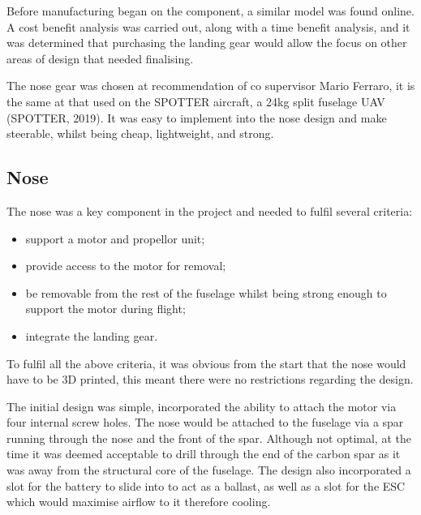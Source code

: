 \documentclass[../../main.tex]{subfiles}
\begin{document}
Before manufacturing began on the component, a similar model was found online. A cost benefit analysis was carried out, along with a time benefit analysis, and it was determined that purchasing the landing gear would allow the focus on other areas of design that needed finalising. 


The nose gear was chosen at recommendation of co supervisor Mario Ferraro, it is the same at that used on the SPOTTER aircraft, a 24kg split fuselage UAV (SPOTTER, 2019). It was easy to implement into the nose design and make steerable, whilst being cheap, lightweight, and strong. 

\subsection{Nose} \label{sec:design-process:final-design-proposal:nose}

The nose was a key component in the project and needed to fulfil several criteria:

\begin{itemize}
    \item support a motor and propellor unit;
    \item provide access to the motor for removal;
    \item be removable from the rest of the fuselage whilst being strong enough to support the motor during flight;
    \item integrate the landing gear.
\end{itemize}

To fulfil all the above criteria, it was obvious from the start that the nose would have to be 3D printed, this meant there were no restrictions regarding the design.  

The initial design was simple, incorporated the ability to attach the motor via four internal screw holes.
The nose would be attached to the fuselage via a spar running through the nose and the front of the spar.
Although not optimal, at the time it was deemed acceptable to drill through the end of the carbon spar as it was away from the structural core of the fuselage.
The design also incorporated a slot for the battery to slide into to act as a ballast, as well as a slot for the ESC which would maximise airflow to it therefore cooling.
\end{document}
